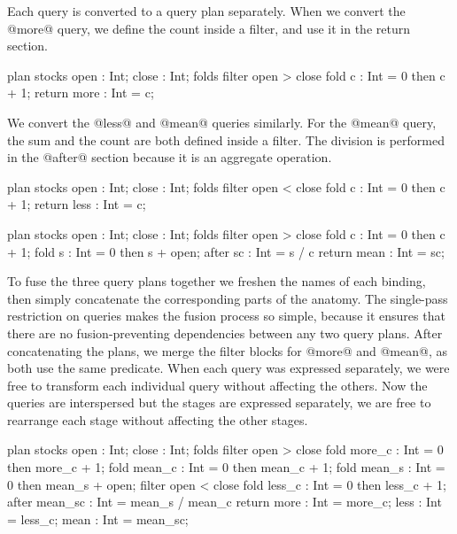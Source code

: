 Each query is converted to a query plan separately.
When we convert the @more@ query, we define the count inside a filter, and use it in the return section.

\begin{icicle-core}
plan stocks { open : Int; close : Int; }
folds { filter open > close {
    fold c    : Int = 0 then c + 1; } }
return { more : Int = c; }
\end{icicle-core}

We convert the @less@ and @mean@ queries similarly.
For the @mean@ query, the sum and the count are both defined inside a filter.
The division is performed in the @after@ section because it is an aggregate operation.

\begin{icicle-core}
plan stocks { open : Int; close : Int; }
folds { filter open < close {
    fold c    : Int = 0 then c + 1; } }
return { less : Int = c; }

plan stocks { open : Int; close : Int; }
folds { filter open > close {
    fold c    : Int = 0 then c + 1;
    fold s    : Int = 0 then s + open; } }
after  { sc   : Int = s / c }
return { mean : Int = sc; }
\end{icicle-core}

To fuse the three query plans together we freshen the names of each binding, then simply concatenate the corresponding parts of the anatomy.
The single-pass restriction on queries makes the fusion process so simple, because it ensures that there are no fusion-preventing dependencies between any two query plans. 
After concatenating the plans, we merge the filter blocks for @more@ and @mean@, as both use the same predicate.
When each query was expressed separately, we were free to transform each individual query without affecting the others.
Now the queries are interspersed but the stages are expressed separately, we are free to rearrange each stage without affecting the other stages.

\begin{icicle-core}
plan stocks { open : Int; close : Int; }
folds {
  filter open > close {
    fold more_c  : Int = 0 then more_c + 1;
    fold mean_c  : Int = 0 then mean_c + 1;
    fold mean_s  : Int = 0 then mean_s + open; }
  filter open < close {
    fold less_c  : Int = 0 then less_c + 1; } }
after  { mean_sc : Int = mean_s / mean_c }
return { more    : Int = more_c;
         less    : Int = less_c;
         mean    : Int = mean_sc; }
\end{icicle-core}

